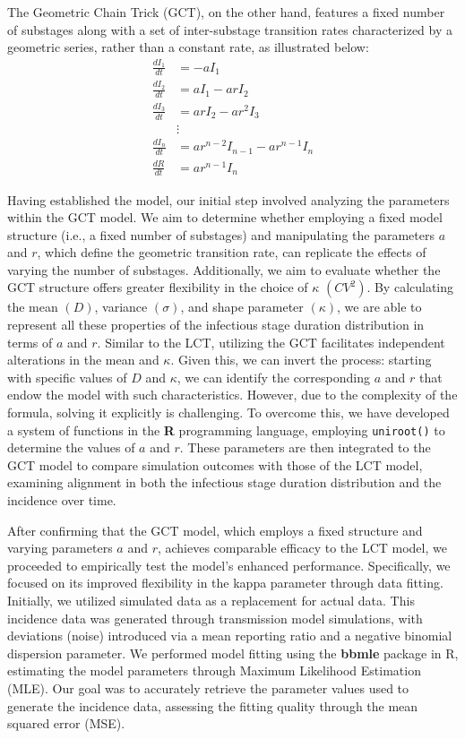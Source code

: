 \documentclass[12pt]{article}
\begin{document}
The Geometric Chain Trick (GCT), on the other hand, features a fixed number of substages along with a set of inter-substage transition rates characterized by a geometric series, rather than a constant rate, as illustrated below:
\begin{align}
    \frac{dI_1}{dt} &= - a I_1 \\
    \frac{dI_2}{dt} &= a I_1 - ar I_2 \\
    \frac{dI_3}{dt} &= ar I_2 - ar^2 I_3 \\
    &\vdots \\
    \frac{dI_n}{dt} &= ar^{n-2} I_{n-1} - ar^{n-1} I_n \\
    \frac{dR}{dt} &= ar^{n-1} I_n
\end{align}

Having established the model, our initial step involved analyzing the parameters within the GCT model. We aim to determine whether employing a fixed model structure (i.e., a fixed number of substages) and manipulating the parameters $a$ and $r$, which define the geometric transition rate, can replicate the effects of varying the number of substages. Additionally, we aim to evaluate whether the GCT structure offers greater flexibility in the choice of $\kappa$ $(CV^2)$. By calculating the mean $(D)$, variance $(\sigma)$, and shape parameter $(\kappa)$, we are able to represent all these properties of the infectious stage duration distribution in terms of $a$ and $r$. Similar to the LCT, utilizing the GCT facilitates independent alterations in the mean and $\kappa$. Given this, we can invert the process: starting with specific values of $D$ and $\kappa$, we can identify the corresponding $a$ and $r$ that endow the model with such characteristics. However, due to the complexity of the formula, solving it explicitly is challenging. To overcome this, we have developed a system of functions in the \textbf{R} programming language, employing \verb|uniroot()| to determine the values of $a$ and $r$. These parameters are then integrated to the GCT model to compare simulation outcomes with those of the LCT model, examining alignment in both the infectious stage duration distribution and the incidence over time.

After confirming that the GCT model, which employs a fixed structure and varying parameters $a$ and $r$, achieves comparable efficacy to the LCT model, we proceeded to empirically test the model's enhanced performance. Specifically, we focused on its improved flexibility in the kappa parameter through data fitting. Initially, we utilized simulated data as a replacement for actual data. This incidence data was generated through transmission model simulations, with deviations (noise) introduced via a mean reporting ratio and a negative binomial dispersion parameter. We performed model fitting using the \textbf{bbmle} package in R, estimating the model parameters through Maximum Likelihood Estimation (MLE). Our goal was to accurately retrieve the parameter values used to generate the incidence data, assessing the fitting quality through the mean squared error (MSE).
\end{document}
